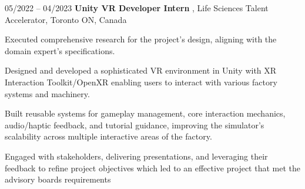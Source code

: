 \begin{twocolentry}{
    05/2022 – 04/2023
}
    \textbf{Unity VR Developer Intern }, Life Sciences Talent Accelerator, Toronto ON, Canada\end{twocolentry}

\vspace{0.10 cm}
\begin{onecolentry}
    \begin{highlights}
        \item Executed comprehensive research for the project's design, aligning with the domain expert’s specifications. 
        \item Designed and developed a sophisticated VR environment in Unity with XR Interaction Toolkit/OpenXR enabling users to interact with various factory systems and machinery.
        \item Built reusable systems for gameplay management, core interaction mechanics, audio/haptic feedback, and tutorial guidance, improving the simulator’s scalability across multiple interactive areas of the factory. 
        \item Engaged with stakeholders, delivering presentations, and leveraging their feedback to refine project objectives which led to an effective project that met the advisory boards requirements
    \end{highlights}
\end{onecolentry}